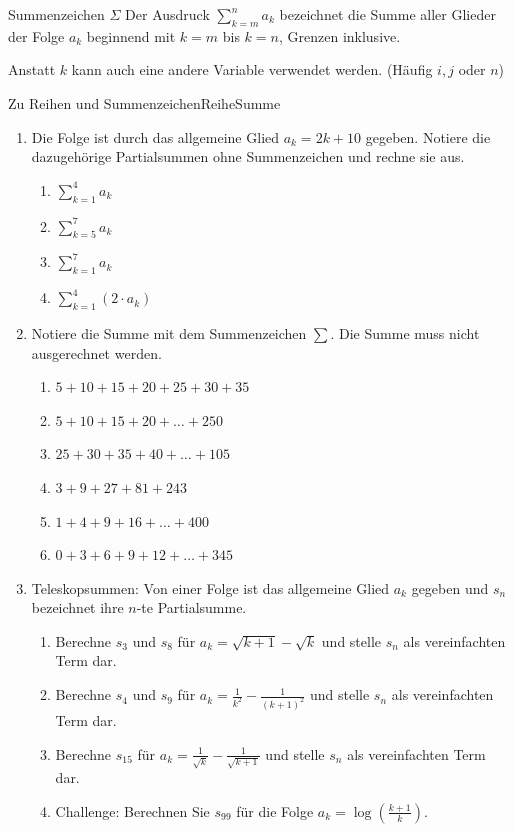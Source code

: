 \begin{definition}
    {Summenzeichen $\Sigma$}{}
    Der Ausdruck  $ \sum\limits_{k=m}^{n} a_k$ bezeichnet die Summe aller Glieder der Folge $a_k$ beginnend mit $k=m$ bis $k=n$, Grenzen inklusive.

    Anstatt $k$ kann auch eine andere Variable verwendet werden. (Häufig $i, j$ oder $n$)
\end{definition}
\clearpage
\begin{ueb}
{Zu Reihen und Summenzeichen}{ReiheSumme}
\begin{enumerate}
\item Die Folge ist durch das allgemeine Glied $a_k = 2k+10$ gegeben. Notiere die dazugehörige Partialsummen ohne Summenzeichen und rechne sie aus.
\begin{enumerate}
    \item $\sum\limits_{k=1}^{4} a_k$
    \item $\sum\limits_{k=5}^{7} a_k$
    \item $\sum\limits_{k=1}^{7} a_k$
    \item $\sum\limits_{k=1}^{4} (2\cdot a_k)$
\end{enumerate}

\item Notiere die Summe mit dem Summenzeichen $\sum$. Die Summe muss nicht ausgerechnet werden.
    \begin{enumerate}
        \item $5 + 10 + 15 + 20 + 25 + 30 + 35$
        \item $5 + 10 + 15 + 20 + \dots + 250$
        \item $25 + 30 + 35 + 40 + \dots + 105$
        \item $3 + 9 + 27 + 81 + 243$
        \item $1 + 4 + 9 + 16 + \dots + 400$
        \item $0 + 3 + 6 + 9 + 12 + \dots + 345$
    \end{enumerate}
\item Teleskopsummen: Von einer Folge ist das allgemeine Glied $a_k$ gegeben und $s_n$ bezeichnet ihre $n$-te Partialsumme.
\begin{enumerate}
    \item Berechne $s_3$ und $s_8$ für $a_k = \sqrt{k+1} - \sqrt{k}$ und stelle $s_n$ als vereinfachten Term dar.
    \item Berechne $s_4$ und $s_9$ für $a_k = \frac{1}{k^2} - \frac{1}{(k+1)^2}$ und stelle $s_n$ als vereinfachten Term dar.
    \item Berechne $s_{15}$ für $a_k = \frac{1}{\sqrt{k}} - \frac{1}{\sqrt{k+1}}$ und stelle $s_n$ als vereinfachten Term dar.
    \item Challenge: Berechnen Sie $s_{99}$ für die Folge $a_k = \log\left(\frac{k+1}{k}\right)$.
\end{enumerate}
\end{enumerate}
\end{ueb}

